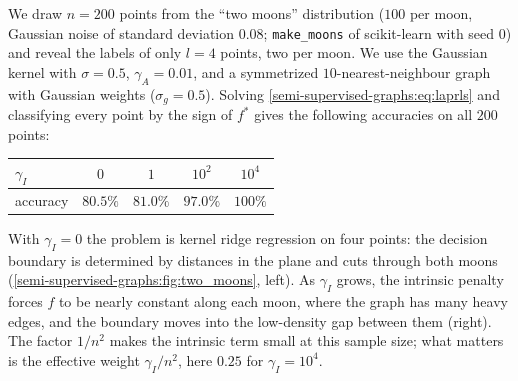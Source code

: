 \begin{notechapter}
\begin{example}
\label{semi-supervised-graphs:ex:manifold_two_moons}
We draw $n = 200$ points from the ``two moons'' distribution ($100$ per moon, Gaussian noise of standard deviation $0.08$; \texttt{make\_moons} of scikit-learn with seed $0$) and reveal the labels of only $l = 4$ points, two per moon. We use the Gaussian kernel with $\sigma = 0.5$, $\gamma_A = 0.01$, and a symmetrized $10$-nearest-neighbour graph with Gaussian weights ($\sigma_g = 0.5$). Solving \eqref{semi-supervised-graphs:eq:laprls} and classifying every point by the sign of $f^*$ gives the following accuracies on all $200$ points:
\begin{center}
\begin{tabular}{lcccc}
\toprule
$\gamma_I$ & $0$ & $1$ & $10^2$ & $10^4$ \\
\midrule
accuracy & $80.5\%$ & $81.0\%$ & $97.0\%$ & $100\%$ \\
\bottomrule
\end{tabular}
\end{center}
With $\gamma_I = 0$ the problem is kernel ridge regression on four points: the decision boundary is determined by distances in the plane and cuts through both moons (\cref{semi-supervised-graphs:fig:two_moons}, left). As $\gamma_I$ grows, the intrinsic penalty forces $f$ to be nearly constant along each moon, where the graph has many heavy edges, and the boundary moves into the low-density gap between them (right). The factor $1/n^2$ makes the intrinsic term small at this sample size; what matters is the effective weight $\gamma_I/n^2$, here $0.25$ for $\gamma_I = 10^4$.
\end{example}


\end{notechapter}
